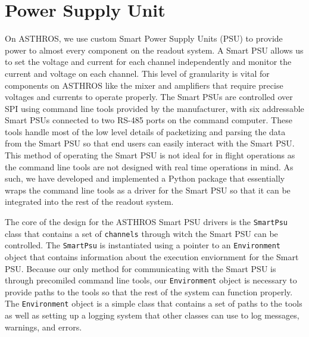 \section{Power Supply Unit}
On ASTHROS, we use custom Smart Power Supply Units (PSU) to provide power to almost every component on the readout system.
A Smart PSU allows us to set the voltage and current for each channel independently and monitor the current and voltage on each channel.
This level of granularity is vital for components on ASTHROS like the mixer and amplifiers that require precise voltages and currents to operate properly.
The Smart PSUs are controlled over SPI using command line tools provided by the manufacturer, with six addressable Smart PSUs connected to two RS-485 ports on the command computer.
These tools handle most of the low level details of packetizing and parsing the data from the Smart PSU so that end users can easily interact with the Smart PSU. 
This method of operating the Smart PSU is not ideal for in flight operations as the command line tools are not designed with real time operations in mind. 
As such, we have developed and implemented a Python package that essentially wraps the command line tools as a driver for the Smart PSU so that it can be integrated into the rest of the readout system. 

The core of the design for the ASTHROS Smart PSU drivers is the \texttt{SmartPsu} class that contains a set of \texttt{channels} through witch the Smart PSU can be controlled.
The \texttt{SmartPsu} is instantiated using a pointer to an \texttt{Environment} object that contains information about the execution enviornment for the Smart PSU.
Because our only method for communicating with the Smart PSU is through precomiled command line tools, our \texttt{Environment} object is necessary to provide paths to the tools so that the rest of the system can function properly. 
The \texttt{Environment} object is a simple class that contains a set of paths to the tools as well as setting up a logging system that other classes can use to log messages, warnings, and errors. 

